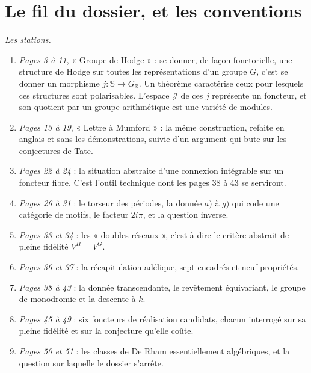 \documentclass[11pt,a4paper]{article}
\begin{document}
\begin{resume}
\end{resume}

\section*{Le fil du dossier, et les conventions}

\emph{Les stations.}

\begin{enumerate}
  \item \emph{Pages 3 à 11}, « Groupe de Hodge » : se donner, de façon
  fonctorielle, une structure de Hodge sur toutes les représentations d'un
  groupe $G$, c'est se donner un morphisme $j : \mathbb{S} \to G_{\mathbb{R}}$.
  Un théorème caractérise ceux pour lesquels ces structures sont polarisables.
  L'espace $\mathcal{J}$ de ces $j$ représente un foncteur, et son quotient par
  un groupe arithmétique est une variété de modules.
  \item \emph{Pages 13 à 19}, « Lettre à Mumford » : la même construction,
  refaite en anglais et sans les démonstrations, suivie d'un argument qui bute
  sur les conjectures de Tate.
  \item \emph{Pages 22 à 24} : la situation abstraite d'une connexion
  intégrable sur un foncteur fibre. C'est l'outil technique dont les pages 38 à
  43 se serviront.
  \item \emph{Pages 26 à 31} : le torseur des périodes, la donnée $a)$ à $g)$
  qui code une catégorie de motifs, le facteur $2i\pi$, et la question inverse.
  \item \emph{Pages 33 et 34} : les « doubles réseaux », c'est-à-dire le
  critère abstrait de pleine fidélité $V^{H} = V^{G}$.
  \item \emph{Pages 36 et 37} : la récapitulation adélique, sept encadrés et
  neuf propriétés.
  \item \emph{Pages 38 à 43} : la donnée transcendante, le revêtement
  équivariant, le groupe de monodromie et la descente à $k$.
  \item \emph{Pages 45 à 49} : six foncteurs de réalisation candidats, chacun
  interrogé sur sa pleine fidélité et sur la conjecture qu'elle coûte.
  \item \emph{Pages 50 et 51} : les classes de De Rham essentiellement
  algébriques, et la question sur laquelle le dossier s'arrête.
\end{enumerate}
\end{document}
